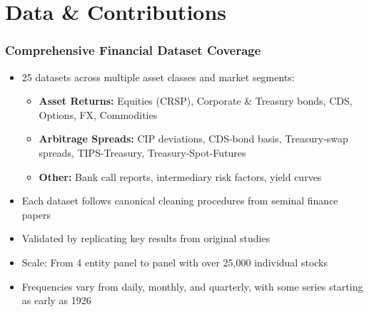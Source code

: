 \documentclass[ignorenonframetext, 9pt]{beamer}
\begin{document}
\section{Data \& Contributions}


\begin{frame}
  \frametitle{Comprehensive Financial Dataset Coverage}
  \begin{itemize}
  \item \alert{25 datasets} across multiple asset classes and market segments:
  \vspace{0.1cm}
  \begin{itemize}
    \item \textbf{Asset Returns:} Equities (CRSP), Corporate \& Treasury bonds, CDS, Options, FX, Commodities
    \item \textbf{Arbitrage Spreads:} CIP deviations, CDS-bond basis, Treasury-swap spreads, TIPS-Treasury, Treasury-Spot-Futures
    \item \textbf{Other:} Bank call reports, intermediary risk factors, yield curves
  \end{itemize}
  \vspace{0.2cm}
  \item Each dataset follows \alert{canonical cleaning procedures} from seminal finance papers
  \vspace{0.1cm}
  \item Validated by replicating key results from original studies
  \vspace{0.1cm}
  \item Scale: From 4 entity panel to panel with over 25,000 individual stocks
  \item Frequencies vary from daily, monthly, and quarterly, with some series starting as early as 1926
  \end{itemize}
\label{slide:data_overview}
\end{frame}
\end{document}
